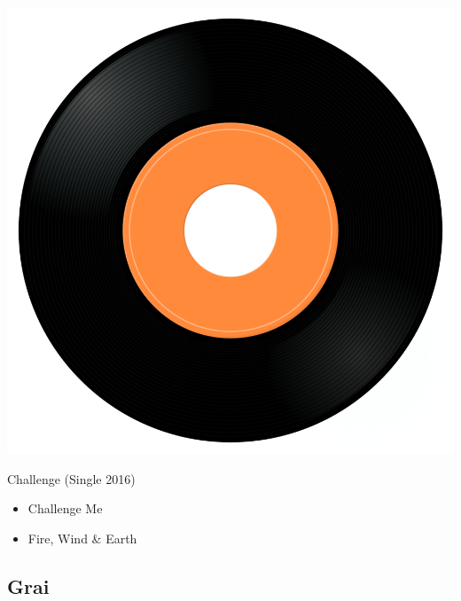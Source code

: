 \begin{minipage}[t]{0.25\textwidth}
\captionsetup{type=figure}
\includegraphics[width=\textwidth]{Images/cover.png}
\caption*{Challenge (Single 2016)}
\end{minipage}
\begin{minipage}[t]{0.25\textwidth}\vspace{0pt}
\begin{itemize}[nosep,leftmargin=1em,labelwidth=*,align=left]
	\setlength{\itemsep}{0pt}
	\item Challenge Me
	\item Fire, Wind \& Earth
\end{itemize}
\end{minipage}

\subsection{Grai}


